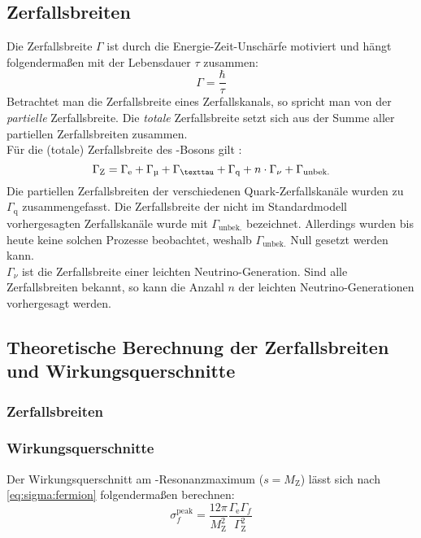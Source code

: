 \subsection{Zerfallsbreiten}
\label{sub:theo:gamma}
Die Zerfallsbreite $\Gamma$ ist durch die Energie-Zeit-Unschärfe motiviert und hängt folgendermaßen mit der Lebensdauer $\tau$ zusammen:
\begin{equation}
    \Gamma = \frac{\hbar}{\tau}
\end{equation}
Betrachtet man die Zerfallsbreite eines Zerfallskanals, so spricht man von der \emph{partielle} Zerfallsbreite. Die \emph{totale} Zerfallsbreite 
setzt sich aus der Summe aller partiellen Zerfallsbreiten zusammen. \\
Für die (totale) Zerfallsbreite des \Z-Bosons gilt \cite{manual}:
\begin{equation}
    \Gamma_\text{Z} = \Gamma_\text{e} + \Gamma_\text{\textmu} + \Gamma_\text{\texttau} + \Gamma_\text{q} + n \cdot \Gamma_\nu + \Gamma_\text{unbek.}
\end{equation}
Die partiellen Zerfallsbreiten der verschiedenen Quark-Zerfallskanäle wurden zu $\Gamma_\text{q}$ zusammengefasst. Die Zerfallsbreite der 
nicht im Standardmodell vorhergesagten Zerfallskanäle wurde mit $\Gamma_\text{unbek.}$ bezeichnet. Allerdings wurden bis heute keine solchen 
Prozesse beobachtet, weshalb $\Gamma_\text{unbek.}$ Null gesetzt werden kann.\\
$\Gamma_\nu$ ist die Zerfallsbreite einer leichten Neutrino-Generation. Sind alle Zerfallsbreiten bekannt, so kann die Anzahl $n$ der leichten 
Neutrino-Generationen vorhergesagt werden.

\subsection{Theoretische Berechnung der Zerfallsbreiten und Wirkungsquerschnitte}
\subsubsection*{Zerfallsbreiten}
\subsubsection{Wirkungsquerschnitte}
Der Wirkungsquerschnitt am \Z-Resonanzmaximum ($s = M_\text{Z}$) lässt sich nach \autoref{eq:sigma:fermion} folgendermaßen berechnen:
\begin{equation}
    \sigma_f^\text{peak} = \frac{12 \pi}{M_\text{Z}^2} \frac{\Gamma_\text{e} \Gamma_f}{\Gamma_\text{Z}^2}
\end{equation}